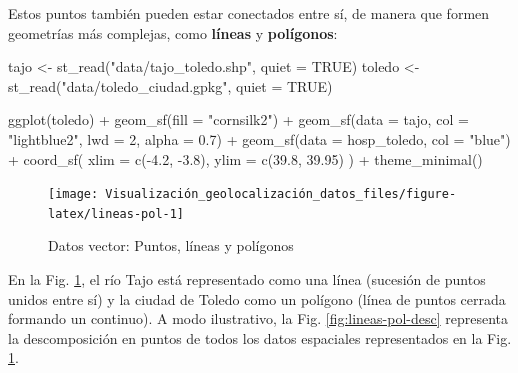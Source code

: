 \documentclass[
]{book}
\newenvironment{Shaded}{\begin{snugshade}}{\end{snugshade}}
\newcommand{\AttributeTok}[1]{\textcolor[rgb]{0.77,0.63,0.00}{#1}}
\newcommand{\ConstantTok}[1]{\textcolor[rgb]{0.00,0.00,0.00}{#1}}
\newcommand{\DecValTok}[1]{\textcolor[rgb]{0.00,0.00,0.81}{#1}}
\newcommand{\FloatTok}[1]{\textcolor[rgb]{0.00,0.00,0.81}{#1}}
\newcommand{\FunctionTok}[1]{\textcolor[rgb]{0.00,0.00,0.00}{#1}}
\newcommand{\NormalTok}[1]{#1}
\newcommand{\OtherTok}[1]{\textcolor[rgb]{0.56,0.35,0.01}{#1}}
\newcommand{\SpecialCharTok}[1]{\textcolor[rgb]{0.00,0.00,0.00}{#1}}
\newcommand{\StringTok}[1]{\textcolor[rgb]{0.31,0.60,0.02}{#1}}
\theoremstyle{definition}
\theoremstyle{definition}
\theoremstyle{definition}
\theoremstyle{definition}
\theoremstyle{remark}
\begin{document}
Estos puntos también pueden estar conectados entre sí, de manera que formen
geometrías más complejas, como \textbf{líneas} y \textbf{polígonos}:

\begin{Shaded}
\begin{Highlighting}[]

\NormalTok{tajo }\OtherTok{\textless{}{-}} \FunctionTok{st\_read}\NormalTok{(}\StringTok{"data/tajo\_toledo.shp"}\NormalTok{, }\AttributeTok{quiet =} \ConstantTok{TRUE}\NormalTok{)}
\NormalTok{toledo }\OtherTok{\textless{}{-}} \FunctionTok{st\_read}\NormalTok{(}\StringTok{"data/toledo\_ciudad.gpkg"}\NormalTok{, }\AttributeTok{quiet =} \ConstantTok{TRUE}\NormalTok{)}


\FunctionTok{ggplot}\NormalTok{(toledo) }\SpecialCharTok{+}
  \FunctionTok{geom\_sf}\NormalTok{(}\AttributeTok{fill =} \StringTok{"cornsilk2"}\NormalTok{) }\SpecialCharTok{+}
  \FunctionTok{geom\_sf}\NormalTok{(}\AttributeTok{data =}\NormalTok{ tajo, }\AttributeTok{col =} \StringTok{"lightblue2"}\NormalTok{, }\AttributeTok{lwd =} \DecValTok{2}\NormalTok{, }\AttributeTok{alpha =} \FloatTok{0.7}\NormalTok{) }\SpecialCharTok{+}
  \FunctionTok{geom\_sf}\NormalTok{(}\AttributeTok{data =}\NormalTok{ hosp\_toledo, }\AttributeTok{col =} \StringTok{"blue"}\NormalTok{) }\SpecialCharTok{+}
  \FunctionTok{coord\_sf}\NormalTok{(}
    \AttributeTok{xlim =} \FunctionTok{c}\NormalTok{(}\SpecialCharTok{{-}}\FloatTok{4.2}\NormalTok{, }\SpecialCharTok{{-}}\FloatTok{3.8}\NormalTok{),}
    \AttributeTok{ylim =} \FunctionTok{c}\NormalTok{(}\FloatTok{39.8}\NormalTok{, }\FloatTok{39.95}\NormalTok{)}
\NormalTok{  ) }\SpecialCharTok{+}
  \FunctionTok{theme\_minimal}\NormalTok{()}
\end{Highlighting}
\end{Shaded}

\begin{figure}

{\centering \texttt{[image: Visualización\_geolocalización\_datos\_files/figure-latex/lineas-pol-1]} 

}

\caption{Datos vector: Puntos, líneas y polígonos}\label{fig:lineas-pol}
\end{figure}

En la Fig. \ref{fig:lineas-pol}, el río Tajo está representado como una línea
(sucesión de puntos unidos entre sí) y la ciudad de Toledo como un polígono
(línea de puntos cerrada formando un continuo). A modo ilustrativo, la Fig.
\ref{fig:lineas-pol-desc} representa la descomposición en puntos de todos los
datos espaciales representados en la Fig. \ref{fig:lineas-pol}.
\end{document}
